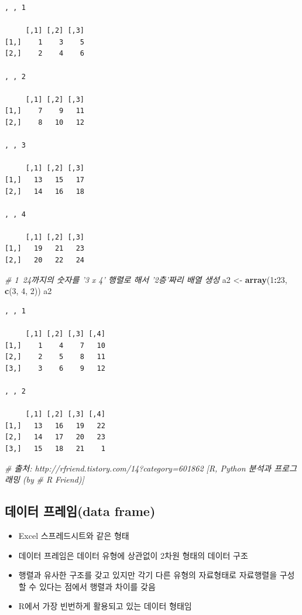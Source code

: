 \documentclass[11pt,a4paper]{book}
\newenvironment{Shaded}{\begin{snugshade}}{\end{snugshade}}
\newcommand{\KeywordTok}[1]{\textcolor[rgb]{0.13,0.29,0.53}{\textbf{#1}}}
\newcommand{\DecValTok}[1]{\textcolor[rgb]{0.00,0.00,0.81}{#1}}
\newcommand{\StringTok}[1]{\textcolor[rgb]{0.31,0.60,0.02}{#1}}
\newcommand{\CommentTok}[1]{\textcolor[rgb]{0.56,0.35,0.01}{\textit{#1}}}
\newcommand{\OperatorTok}[1]{\textcolor[rgb]{0.81,0.36,0.00}{\textbf{#1}}}
\newcommand{\NormalTok}[1]{#1}
\providecommand{\tightlist}{%
  \setlength{\itemsep}{0pt}\setlength{\parskip}{0pt}}
\theoremstyle{definition}
\theoremstyle{definition}
\theoremstyle{definition}
\theoremstyle{remark}
\begin{document}
\begin{verbatim}
, , 1

     [,1] [,2] [,3]
[1,]    1    3    5
[2,]    2    4    6

, , 2

     [,1] [,2] [,3]
[1,]    7    9   11
[2,]    8   10   12

, , 3

     [,1] [,2] [,3]
[1,]   13   15   17
[2,]   14   16   18

, , 4

     [,1] [,2] [,3]
[1,]   19   21   23
[2,]   20   22   24
\end{verbatim}

\begin{Shaded}
\begin{Highlighting}[]
\CommentTok{# 1~24까지의 숫자를 '3 x 4' 행렬로 해서 '2층'짜리 배열 생성}
\NormalTok{a2 <-}\StringTok{ }\KeywordTok{array}\NormalTok{(}\DecValTok{1}\OperatorTok{:}\DecValTok{23}\NormalTok{, }\KeywordTok{c}\NormalTok{(}\DecValTok{3}\NormalTok{, }\DecValTok{4}\NormalTok{, }\DecValTok{2}\NormalTok{))}
\NormalTok{a2}
\end{Highlighting}
\end{Shaded}

\begin{verbatim}
, , 1

     [,1] [,2] [,3] [,4]
[1,]    1    4    7   10
[2,]    2    5    8   11
[3,]    3    6    9   12

, , 2

     [,1] [,2] [,3] [,4]
[1,]   13   16   19   22
[2,]   14   17   20   23
[3,]   15   18   21    1
\end{verbatim}

\begin{Shaded}
\begin{Highlighting}[]
\CommentTok{# 출처: http://rfriend.tistory.com/14?category=601862 [R, Python 분석과 프로그래밍 (by}
\CommentTok{# R Friend)]}
\end{Highlighting}
\end{Shaded}

\normalsize

\subsection{데이터 프레임(data frame)}\label{-data-frame}

\begin{itemize}
\tightlist
\item
  Excel 스프레드시트와 같은 형태
\item
  데이터 프레임은 데이터 유형에 상관없이 2차원 형태의 데이터 구조
\item
  행렬과 유사한 구조를 갖고 있지만 각기 다른 유형의 자료형태로
  자료행렬을 구성할 수 있다는 점에서 행렬과 차이를 갖음
\item
  R에서 가장 빈번하게 활용되고 있는 데이터 형태임
\end{itemize}
\end{document}
